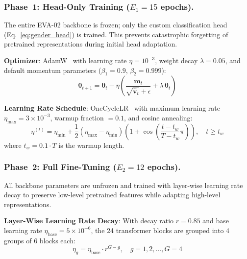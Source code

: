 \documentclass[11pt,a4paper]{article}
\begin{document}
\subsubsection{Phase~1: Head-Only Training ($E_1 = 15$ epochs).}
The entire EVA-02 backbone is frozen; only the custom classification head (Eq.~\eqref{eq:gender_head}) is trained. This prevents catastrophic forgetting of pretrained representations during initial head adaptation.

\textbf{Optimizer}: AdamW~\cite{adamw} with learning rate $\eta = 10^{-3}$, weight decay $\lambda = 0.05$, and default momentum parameters ($\beta_1 = 0.9$, $\beta_2 = 0.999$):
\begin{equation}
\boldsymbol{\theta}_{t+1} = \boldsymbol{\theta}_t - \eta \left(\frac{\hat{\mathbf{m}}_t}{\sqrt{\hat{\mathbf{v}}_t} + \epsilon} + \lambda\,\boldsymbol{\theta}_t\right)
\label{eq:adamw}
\end{equation}

\textbf{Learning Rate Schedule}: OneCycleLR~\cite{onecycle} with maximum learning rate $\eta_{\max} = 3 \times 10^{-3}$, warmup fraction $= 0.1$, and cosine annealing:
\begin{equation}
\eta^{(t)} = \eta_{\min} + \frac{1}{2}(\eta_{\max} - \eta_{\min})\left(1 + \cos\!\left(\frac{t - t_w}{T - t_w}\pi\right)\right), \quad t \geq t_w
\end{equation}
where $t_w = 0.1 \cdot T$ is the warmup length.

\subsubsection{Phase~2: Full Fine-Tuning ($E_2 = 12$ epochs).}
All backbone parameters are unfrozen and trained with layer-wise learning rate decay to preserve low-level pretrained features while adapting high-level representations.

\textbf{Layer-Wise Learning Rate Decay}: With decay ratio $r = 0.85$ and base learning rate $\eta_{\text{base}} = 5 \times 10^{-6}$, the 24 transformer blocks are grouped into 4 groups of 6 blocks each:
\begin{equation}
\eta_g = \eta_{\text{base}} \cdot r^{G - g}, \quad g = 1, 2, \ldots, G = 4
\label{eq:layerwise_lr}
\end{equation}
\end{document}
